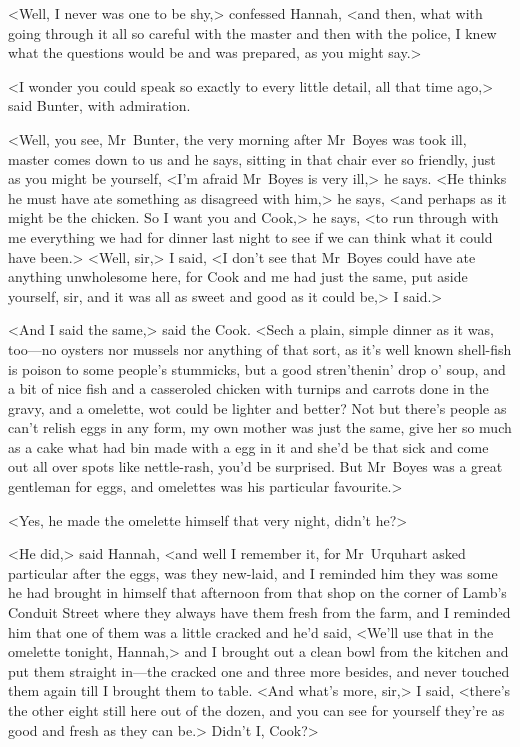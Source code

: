 <Well, I never was one to be shy,> confessed Hannah, <and then, what with going through it all so careful with the master and then with the police, I knew what the questions would be and was prepared, as you might say.>

<I wonder you could speak so exactly to every little detail, all that time ago,> said Bunter, with admiration.

<Well, you see, Mr~Bunter, the very morning after Mr~Boyes was took ill, master comes down to us and he says, sitting in that chair ever so friendly, just as you might be yourself, <I'm afraid Mr~Boyes is very ill,> he says. <He thinks he must have ate something as disagreed with him,> he says, <and perhaps as it might be the chicken. So I want you and Cook,> he says, <to run through with me everything we had for dinner last night to see if we can think what it could have been.> <Well, sir,> I said, <I don't see that Mr~Boyes could have ate anything unwholesome here, for Cook and me had just the same, put aside yourself, sir, and it was all as sweet and good as it could be,> I said.>

<And I said the same,> said the Cook. <Sech a plain, simple dinner as it was, too—no oysters nor mussels nor anything of that sort, as it's well known shell-fish is poison to some people's stummicks, but a good stren'thenin' drop o' soup, and a bit of nice fish and a casseroled chicken with turnips and carrots done in the gravy, and a omelette, wot could be lighter and better? Not but there's people as can't relish eggs in any form, my own mother was just the same, give her so much as a cake what had bin made with a egg in it and she'd be that sick and come out all over spots like nettle-rash, you'd be surprised. But Mr~Boyes was a great gentleman for eggs, and omelettes was his particular favourite.>

<Yes, he made the omelette himself that very night, didn't he?>

<He did,> said Hannah, <and well I remember it, for Mr~Urquhart asked particular after the eggs, was they new-laid, and I reminded him they was some he had brought in himself that afternoon from that shop on the corner of Lamb's Conduit Street where they always have them fresh from the farm, and I reminded him that one of them was a little cracked and he'd said, <We'll use that in the omelette tonight, Hannah,> and I brought out a clean bowl from the kitchen and put them straight in—the cracked one and three more besides, and never touched them again till I brought them to table. <And what's more, sir,> I said, <there's the other eight still here out of the dozen, and you can see for yourself they're as good and fresh as they can be.> Didn't I, Cook?>

